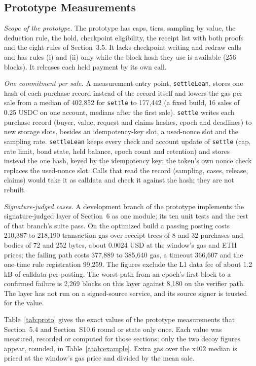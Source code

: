 \documentclass[10pt,a4paper]{article}
\theoremstyle{plain}
\theoremstyle{remark}
\begin{document}
\subsection{Prototype Measurements}
\label{sec:proto}

\emph{Scope of the prototype.} The prototype has caps, tiers, sampling by value, the deduction rule, the hold, checkpoint eligibility, the receipt list with both proofs and the eight rules of Section~3.5. It lacks checkpoint writing and redraw calls and has rules (i) and (ii) only while the block hash they use is available (256 blocks). It releases each held payment by its own call.

\emph{One commitment per sale.} A measurement entry point, \texttt{settleLean}, stores one hash of each purchase record instead of the record itself and lowers the gas per sale from a median of 402,852 for \texttt{settle} to 177,442 (a fixed build, 16 sales of 0.25 USDC on one account, medians after the first sale). \texttt{settle} writes each purchase record (buyer, value, request and claims hashes, epoch and deadlines) to new storage slots, besides an idempotency-key slot, a used-nonce slot and the sampling rate. \texttt{settleLean} keeps every check and account update of \texttt{settle} (cap, rate limit, bond state, held balance, epoch count and retention) and stores instead the one hash, keyed by the idempotency key; the token's own nonce check replaces the used-nonce slot. Calls that read the record (sampling, cases, release, claims) would take it as calldata and check it against the hash; they are not rebuilt.

\emph{Signature-judged cases.} A development branch of the prototype implements the signature-judged layer of Section~6 as one module; its ten unit tests and the rest of that branch's suite pass. On the optimized build a passing posting costs 210,387 to 218,190 transaction gas over receipt trees of 8 and 32 purchases and bodies of 72 and 252 bytes, about 0.0024 USD at the window's gas and ETH prices; the failing path costs 377,889 to 385,640 gas, a timeout 366,607 and the one-time rule registration 99,259. The figures exclude the L1 data fee of about 1.2 kB of calldata per posting. The worst path from an epoch's first block to a confirmed failure is 2,269 blocks on this layer against 8,180 on the verifier path. The layer has not run on a signed-source service, and its source signer is trusted for the value.

Table~\ref{tab:proto} gives the exact values of the prototype measurements that Section~5.4 and Section~S10.6 round or state only once. Each value was measured, recorded or computed for those sections; only the two decoy figures appear, rounded, in Table~\ref{atab:example}. Extra gas over the x402 median is priced at the window's gas price and divided by the mean sale.
\end{document}
